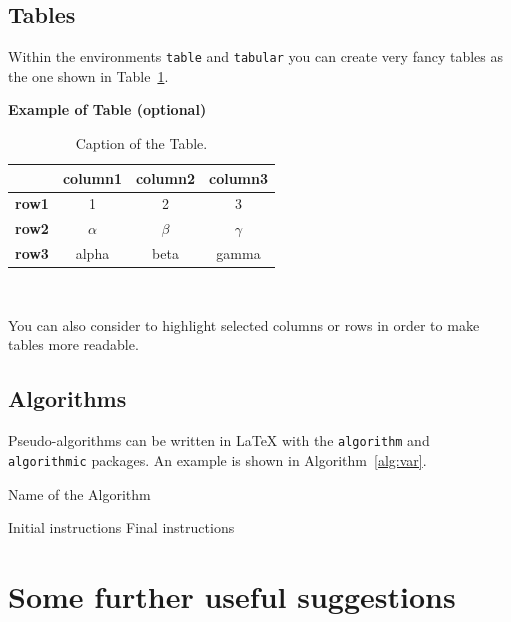 \documentclass[11pt,a4paper]{article}
\begin{document}
\subsection{Tables}
\label{subsec:tables}

Within the environments \texttt{table} and  \texttt{tabular} you can create very fancy tables as the one shown in Table~\ref{table:example}.

\begin{table}[H]
    \caption*{\textbf{Example of Table (optional)}}
    \centering 
    \begin{tabular}{|p{3em} c c c |}
    \hline
    \rowcolor{newblue!40}
     & \textbf{column1} & \textbf{column2} & \textbf{column3} \T\B \\
    \hline \hline
    \textbf{row1} & 1 & 2 & 3 \T\B \\
    \textbf{row2} & $\alpha$ & $\beta$ & $\gamma$ \T\B\\
    \textbf{row3} & alpha & beta & gamma \B\\
    \hline
    \end{tabular}
    \\[10pt]
    \caption{Caption of the Table.}
    \label{table:example}
\end{table}

You can also consider to highlight selected columns or rows in order to make tables more readable.

\subsection{Algorithms}
\label{subsec:algorithms}

Pseudo-algorithms can be written in \LaTeX{} with the \texttt{algorithm} and \texttt{algorithmic} packages.
An example is shown in Algorithm~\ref{alg:var}.
\begin{algorithm}[H]
\label{alg:example}
\caption{Name of the Algorithm}
\label{alg:var}
\label{protocol1}
\begin{algorithmic}[1]
\STATE Initial instructions
\ENDIF
\ENDFOR
{}
\ENDWHILE
\STATE Final instructions
\end{algorithmic}
\end{algorithm} 

\section{Some further useful suggestions}
\end{document}
